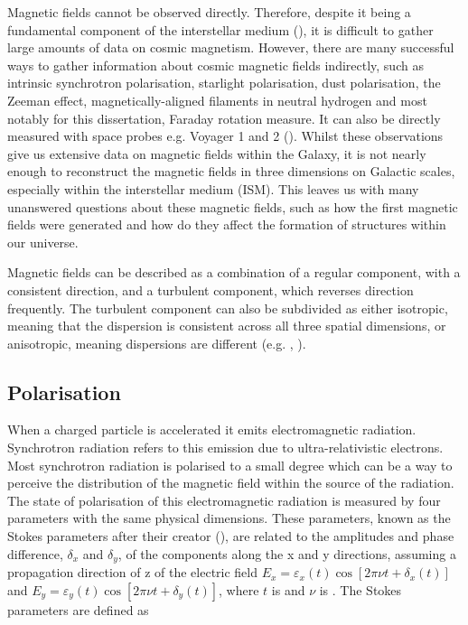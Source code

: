 Magnetic fields cannot be observed directly. Therefore, despite it being a fundamental component of the interstellar medium (\cite{Ferriere_2001}), it is difficult to gather large amounts of data on cosmic magnetism. However, there are many successful ways to gather information about cosmic magnetic fields indirectly, such as intrinsic synchrotron polarisation, starlight polarisation, dust polarisation, the Zeeman effect, magnetically-aligned filaments in neutral hydrogen and most notably for this dissertation, Faraday rotation measure. It can also be directly measured with space probes e.g. Voyager 1 and 2 (\cite{voyager}). Whilst these observations give us extensive data on magnetic fields within the Galaxy, it is not nearly enough to reconstruct the magnetic fields in three dimensions on Galactic scales, especially within the interstellar medium (ISM). This leaves us with many unanswered questions about these magnetic fields, such as how the first magnetic fields were generated and how do they affect the formation of structures within our universe. 

Magnetic fields can be described as a combination of a regular component, with a consistent direction, and a turbulent component, which reverses direction frequently. The turbulent component can also be subdivided as either isotropic, meaning that the dispersion is consistent across all three spatial dimensions, or anisotropic, meaning dispersions are different (e.g. \cite{Jaffe_2010}, \cite{Beck_cosmic}). 


\subsection{Polarisation}

When a charged particle is accelerated it emits electromagnetic radiation. Synchrotron radiation refers to this emission due to ultra-relativistic electrons. Most synchrotron radiation is polarised to a small degree which can be a way to perceive the distribution of the magnetic field within the source of the radiation. The state of polarisation of this electromagnetic radiation is measured by four parameters with the same physical dimensions. These parameters, known as the Stokes parameters after their creator (\cite{Stokes}), are related to the amplitudes and phase difference, $\delta_x$ and $\delta_y$, of the components along the x and y directions, assuming a propagation direction of z of the electric field $E_x = \varepsilon_x(t)\cos [2\pi\nu t+\delta_x(t)]$ and $E_y = \varepsilon_y(t)\cos [2\pi\nu t+\delta_y(t)]$, where $t$ is and $\nu$ is . The Stokes parameters are defined as 

